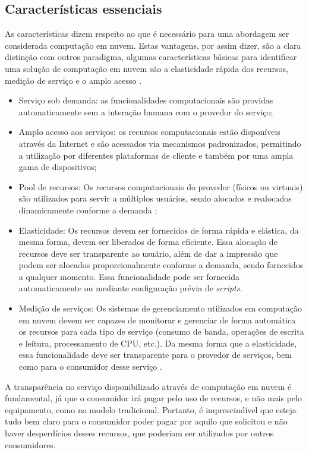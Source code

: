 \documentclass[twoside,english,brazilian]{UNISINOSartigo}
\begin{document}
\subsection{Características essenciais}
As características dizem respeito ao que é necessário para uma abordagem ser considerada computação em nuvem. Estas vantagens, por assim dizer, são a clara distinção com outros paradigma, algumas características básicas para identificar uma solução de computação em nuvem são a elasticidade rápida dos recursos, medição de serviço e o amplo acesso \cite{Moreira2010}.
\begin{itemize}
	\item Serviço sob demanda: as funcionalidades computacionais são providas automaticamente sem a interação humana com o provedor do serviço;
	\item Amplo acesso aos serviços: os recursos computacionais estão disponíveis através da Internet e são acessados via mecanismos padronizados, permitindo a utilização por diferentes plataformas de cliente e também por uma ampla gama de dispositivos;
	\item Pool de recursos: Os recursos computacionais do provedor (físicos ou virtuais) são utilizados para servir a múltiplos usuários, sendo alocados e realocados dinamicamente conforme a demanda \cite{verascloud};
	\item Elasticidade: Os recursos devem ser fornecidos de forma rápida e elástica, da mesma forma, devem ser liberados de forma eficiente. Essa alocação de recursos deve ser transparente ao usuário, além de dar a impressão que podem ser alocados proporcionalmente conforme a demanda, sendo fornecidos a qualquer momento. Essa funcionalidade pode ser fornecida automaticamente ou mediante configuração prévia de \textit{scripts}.
	\item Medição de serviços: Os sistemas de gerenciamento utilizados em computação em nuvem devem ser capazes de monitorar e gerenciar de forma automática os recursos para cada tipo de serviço (consumo de banda, operações de escrita e leitura, processamento de CPU, etc.). Da mesma forma que a elasticidade, essa funcionalidade deve ser transparente para o provedor de serviços, bem como para o consumidor desse serviço \cite{verascloud}.
\end{itemize}
A transparência no serviço disponibilizado através de computação em nuvem é fundamental, já que o consumidor irá pagar pelo uso de recursos, e não mais pelo equipamento, como no modelo tradicional. Portanto, é imprescindível que esteja tudo bem claro para o consumidor poder pagar por aquilo que solicitou e não haver desperdícios desses recursos, que poderiam ser utilizados por outros consumidores.
\end{document}

